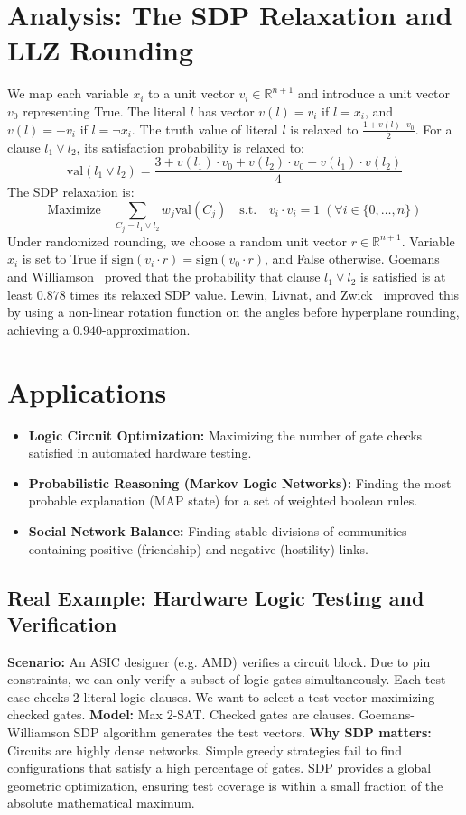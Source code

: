 \section{Analysis: The SDP Relaxation and LLZ Rounding}
We map each variable $x_i$ to a unit vector $v_i \in \mathbb{R}^{n+1}$ and introduce a unit vector $v_0$ representing True. The literal $l$ has vector $v(l) = v_i$ if $l = x_i$, and $v(l) = -v_i$ if $l = \neg x_i$.
The truth value of literal $l$ is relaxed to $\frac{1 + v(l) \cdot v_0}{2}$.
For a clause $l_1 \lor l_2$, its satisfaction probability is relaxed to:
\[
\text{val}(l_1 \lor l_2) = \frac{3 + v(l_1) \cdot v_0 + v(l_2) \cdot v_0 - v(l_1) \cdot v(l_2)}{4}
\]
The SDP relaxation is:
\[
\text{Maximize} \quad \sum_{C_j = l_1 \lor l_2} w_j \text{val}(C_j) \quad \text{s.t.} \quad v_i \cdot v_i = 1 \; (\forall i \in \{0, \dots, n\})
\]
Under randomized rounding, we choose a random unit vector $r \in \mathbb{R}^{n+1}$. Variable $x_i$ is set to True if $\text{sign}(v_i \cdot r) = \text{sign}(v_0 \cdot r)$, and False otherwise.
Goemans and Williamson~\cite{goemans-williamson94} proved that the probability that clause $l_1 \lor l_2$ is satisfied is at least $0.878$ times its relaxed SDP value.
Lewin, Livnat, and Zwick~\cite{lewin-livnat-zwick02} improved this by using a non-linear rotation function on the angles before hyperplane rounding, achieving a $0.940$-approximation.

\section{Applications}
\begin{itemize}
    \item \textbf{Logic Circuit Optimization:} Maximizing the number of gate checks satisfied in automated hardware testing.
    \item \textbf{Probabilistic Reasoning (Markov Logic Networks):} Finding the most probable explanation (MAP state) for a set of weighted boolean rules.
    \item \textbf{Social Network Balance:} Finding stable divisions of communities containing positive (friendship) and negative (hostility) links.
\end{itemize}

\subsection*{Real Example: Hardware Logic Testing and Verification}
\textbf{Scenario:} An ASIC designer (e.g. AMD) verifies a circuit block. Due to pin constraints, we can only verify a subset of logic gates simultaneously. Each test case checks 2-literal logic clauses. We want to select a test vector maximizing checked gates.
\textbf{Model:} Max 2-SAT. Checked gates are clauses. Goemans-Williamson SDP algorithm generates the test vectors.
\textbf{Why SDP matters:} Circuits are highly dense networks. Simple greedy strategies fail to find configurations that satisfy a high percentage of gates. SDP provides a global geometric optimization, ensuring test coverage is within a small fraction of the absolute mathematical maximum.

